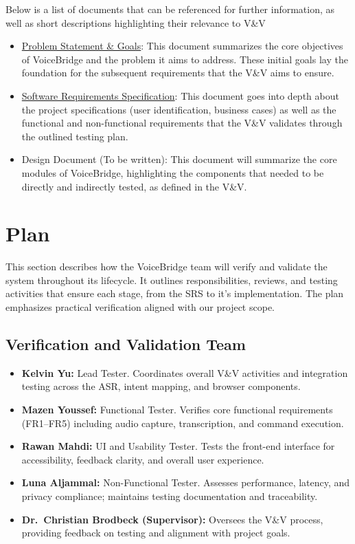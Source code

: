 \documentclass[12pt, titlepage]{article}
\begin{document}
Below is a list of documents that can be referenced for further information, as well as short descriptions highlighting their relevance to V\&V
\begin{itemize}
  \item \href{https://github.com/speech-buddies/VoiceBridge/blob/main/docs/ProblemStatementAndGoals/ProblemStatement.pdf}{Problem Statement \& Goals}: This document summarizes the core objectives of VoiceBridge and the problem it aims to address. These initial goals lay the foundation for the subsequent requirements that the V\&V aims to ensure.
  \item \href{https://github.com/speech-buddies/VoiceBridge/blob/main/docs/SRS-Volere/SRS.pdf}{Software Requirements Specification}: This document goes into depth about the project specifications (user identification, business cases) as well as the functional and non-functional requirements that the V\&V validates through the outlined testing plan. 
  \item Design Document (To be written): This document will summarize the core modules of VoiceBridge, highlighting the components that needed to be directly and indirectly tested, as defined in the V\&V.
\end{itemize}



\section{Plan}

This section describes how the VoiceBridge team will verify and validate the system throughout its lifecycle. It outlines responsibilities, reviews, and testing activities that ensure each stage, from the SRS to it’s implementation. The plan emphasizes practical verification aligned with our project scope.

\subsection{Verification and Validation Team}

\begin{itemize}
    \item \textbf{Kelvin Yu:} Lead Tester. Coordinates overall V\&V activities and integration testing across the ASR, intent mapping, and browser components.
    \item \textbf{Mazen Youssef:} Functional Tester. Verifies core functional requirements (FR1--FR5) including audio capture, transcription, and command execution.
    \item \textbf{Rawan Mahdi:} UI and Usability Tester. Tests the front-end interface for accessibility, feedback clarity, and overall user experience.
    \item \textbf{Luna Aljammal:} Non-Functional Tester. Assesses performance, latency, and privacy compliance; maintains testing documentation and traceability.
    \item \textbf{Dr.~Christian Brodbeck (Supervisor):} Oversees the V\&V process, providing feedback on testing and alignment with project goals.
\end{itemize}
\end{document}
